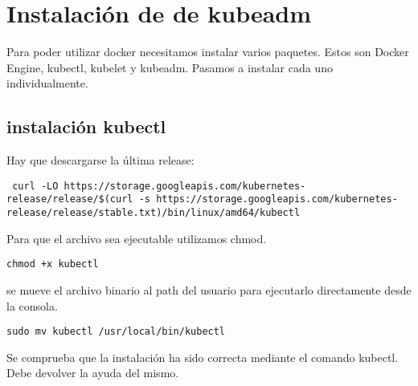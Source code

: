 \documentclass[../main.tex]{subfiles}
\begin{document}
\section{Instalación de de kubeadm}
Para poder utilizar docker necesitamos instalar varios paquetes. Estos son Docker Engine, kubectl, kubelet y kubeadm. Pasamos a instalar cada uno individualmente. 

\subsection{instalación kubectl}
Hay que descargarse la última release:

\begin{lstlisting}
 curl -LO https://storage.googleapis.com/kubernetes-release/release/$(curl -s https://storage.googleapis.com/kubernetes-release/release/stable.txt)/bin/linux/amd64/kubectl
\end{lstlisting}

Para que el archivo sea ejecutable utilizamos chmod.
\begin{lstlisting}
chmod +x kubectl
\end{lstlisting}
se mueve el archivo binario al path del usuario para ejecutarlo directamente desde la consola.

\begin{lstlisting}
sudo mv kubectl /usr/local/bin/kubectl
\end{lstlisting}
 
Se comprueba que la instalación ha sido correcta mediante el comando kubectl. Debe devolver la ayuda del mismo.
\end{document}
